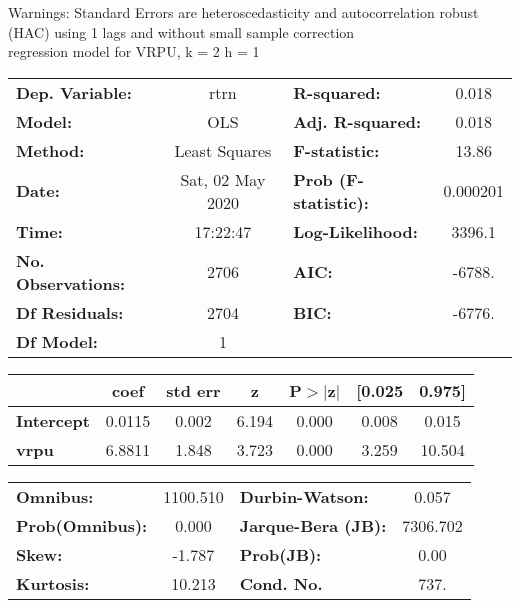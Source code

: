 Warnings: \newline
 [1] Standard Errors are heteroscedasticity and autocorrelation robust (HAC) using 1 lags and without small sample correction\\ 

regression model for VRPU, k = 2 h = 1\begin{center}
\begin{tabular}{lclc}
\toprule
\textbf{Dep. Variable:}    &       rtrn       & \textbf{  R-squared:         } &     0.018   \\
\textbf{Model:}            &       OLS        & \textbf{  Adj. R-squared:    } &     0.018   \\
\textbf{Method:}           &  Least Squares   & \textbf{  F-statistic:       } &     13.86   \\
\textbf{Date:}             & Sat, 02 May 2020 & \textbf{  Prob (F-statistic):} &  0.000201   \\
\textbf{Time:}             &     17:22:47     & \textbf{  Log-Likelihood:    } &    3396.1   \\
\textbf{No. Observations:} &        2706      & \textbf{  AIC:               } &    -6788.   \\
\textbf{Df Residuals:}     &        2704      & \textbf{  BIC:               } &    -6776.   \\
\textbf{Df Model:}         &           1      & \textbf{                     } &             \\
\bottomrule
\end{tabular}
\begin{tabular}{lcccccc}
                   & \textbf{coef} & \textbf{std err} & \textbf{z} & \textbf{P$> |$z$|$} & \textbf{[0.025} & \textbf{0.975]}  \\
\midrule
\textbf{Intercept} &       0.0115  &        0.002     &     6.194  &         0.000        &        0.008    &        0.015     \\
\textbf{vrpu}      &       6.8811  &        1.848     &     3.723  &         0.000        &        3.259    &       10.504     \\
\bottomrule
\end{tabular}
\begin{tabular}{lclc}
\textbf{Omnibus:}       & 1100.510 & \textbf{  Durbin-Watson:     } &    0.057  \\
\textbf{Prob(Omnibus):} &   0.000  & \textbf{  Jarque-Bera (JB):  } & 7306.702  \\
\textbf{Skew:}          &  -1.787  & \textbf{  Prob(JB):          } &     0.00  \\
\textbf{Kurtosis:}      &  10.213  & \textbf{  Cond. No.          } &     737.  \\
\bottomrule
\end{tabular}
\end{center}

